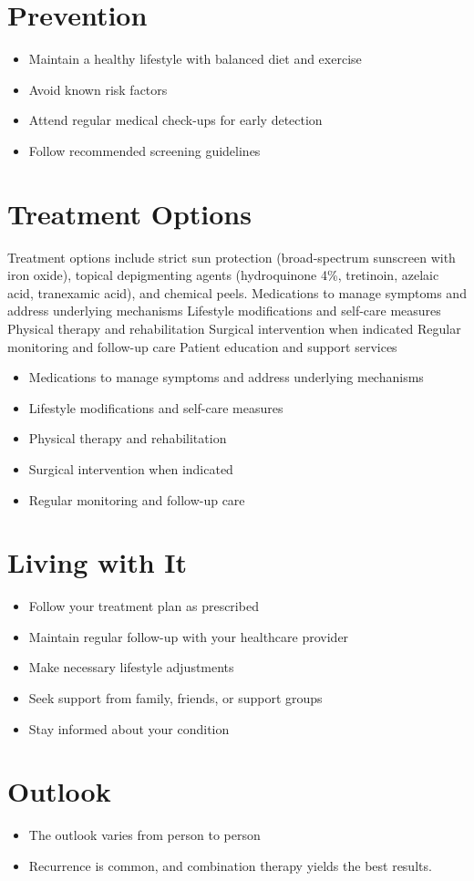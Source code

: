 \section{Prevention}
\begin{itemize}[noitemsep]
  \item Maintain a healthy lifestyle with balanced diet and exercise
  \item Avoid known risk factors
  \item Attend regular medical check-ups for early detection
  \item Follow recommended screening guidelines
\end{itemize}
\section{Treatment Options}
Treatment options include strict sun protection (broad-spectrum sunscreen with iron oxide), topical depigmenting agents (hydroquinone 4\%, tretinoin, azelaic acid, tranexamic acid), and chemical peels. Medications to manage symptoms and address underlying mechanisms Lifestyle modifications and self-care measures Physical therapy and rehabilitation Surgical intervention when indicated Regular monitoring and follow-up care Patient education and support services

\begin{itemize}[noitemsep]
  \item Medications to manage symptoms and address underlying mechanisms
  \item Lifestyle modifications and self-care measures
  \item Physical therapy and rehabilitation
  \item Surgical intervention when indicated
  \item Regular monitoring and follow-up care
\end{itemize}
\section{Living with It}
\begin{itemize}[noitemsep]
  \item Follow your treatment plan as prescribed
  \item Maintain regular follow-up with your healthcare provider
  \item Make necessary lifestyle adjustments
  \item Seek support from family, friends, or support groups
  \item Stay informed about your condition
\end{itemize}
\section{Outlook}
\begin{itemize}[noitemsep]
  \item The outlook varies from person to person
  \item Recurrence is common, and combination therapy yields the best results.
\end{itemize}
